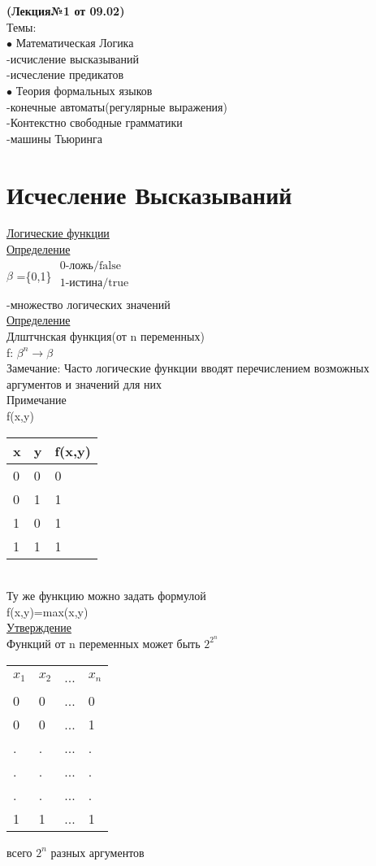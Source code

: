 \documentclass{article}
\begin{document}
\textbf{(Лекция№1 от 09.02)}\\
Темы:\\
$\bullet$ Математическая Логика\\
-исчисление высказываний\\
-исчесление предикатов\\
$\bullet$ Теория формальных языков\\
-конечные автоматы(регулярные выражения)\\
-Контекстно свободные грамматики\\
-машины Тьюринга
\section{Исчесление Высказываний}
\underline{Логические функции}\\
\underline{Определение}\\
$\beta$ =\{0,1\} $ \left.
\begin{array}{rcll}
\textrm{0-ложь/false }\\
\textrm{1-истина/true}\\
\end{array}
\right.
$ \\  
-множество логических значений\\
\underline{Определение}\\
Длштчнская функция(от n переменных)\\
f: $\beta^n\rightarrow \beta$\\
Замечание: Часто логические функции вводят перечислением возможных аргументов и значений для них\\
Примечание\\
f(x,y)\\
\begin{tabular}{ll|l}
 x&y&f(x,y)\\
\hline
0 & 0 &0\\
0 &  1 & 1\\
1 &  0 & 1\\
1&  1 & 1\\
\end{tabular}\\
Ту же функцию можно задать формулой\\
f(x,y)=max(x,y)\\
\underline{Утверждение}\\
Функций от n переменных может быть $2^{2^n}$\\
\begin{tabular}{llll}
 $x_1$&$x_2$&...&$x_n$\\
0 & 0& ...&0\\
0& 0 &...& 1\\
.& . &...& .\\
. &  . &...& .\\
.&  . &...& .\\
1&  1 &...& 1\\
\end{tabular} всего $2^n$ разных аргументов\\
\end{document}

